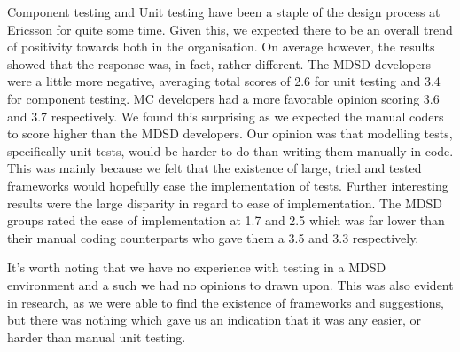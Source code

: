 \documentclass[final_report_innit.tex]{subfiles}
\begin{document}
Component testing and Unit testing have been a staple of the design process at Ericsson for quite some time. Given this, we expected there to be an overall trend of positivity towards both in the organisation. On average however, the results showed that the response was, in fact, rather different. The MDSD developers were a little more negative, averaging total scores of 2.6 for unit testing and 3.4 for component testing. MC developers had a more favorable opinion scoring 3.6 and 3.7 respectively. We found this surprising as we expected the manual coders to score higher than the MDSD developers. Our opinion was that modelling tests, specifically unit tests, would be harder to do than writing them manually in code. This was mainly because we felt that the existence of large, tried and tested frameworks would hopefully ease the implementation of tests. Further interesting results were the large disparity in regard to ease of implementation. The MDSD groups rated the ease of implementation at 1.7 and 2.5 which was far lower than their manual coding counterparts who gave them a 3.5 and 3.3 respectively.

It's worth noting that we have no experience with testing in a MDSD environment and a such we had no opinions to drawn upon. This was also evident in research, as we were able to find the existence of frameworks and suggestions, but there was nothing which gave us an indication that it was any easier, or harder than manual unit testing.
\end{document}
